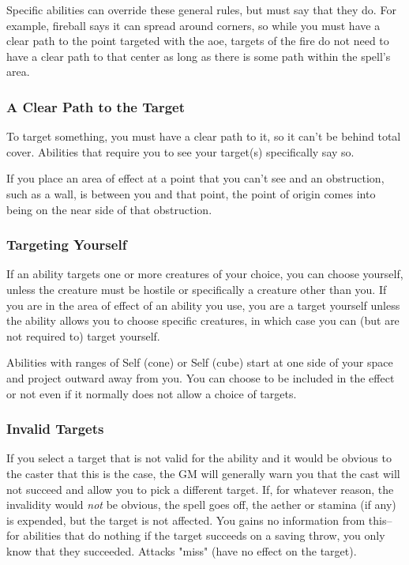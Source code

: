 Specific abilities can override these general rules, but must say that they do. For example, fireball says it can spread around corners, so while you must have a clear path to the point targeted with the aoe, targets of the fire do not need to have a clear path to that center as long as there is some path within the spell's area.

\subsubsection{A Clear Path to the Target}

To target something, you must have a clear path to it, so it can't be behind total cover. Abilities that require you to see your target(s) specifically say so.

If you place an area of effect at a point that you can't see and an obstruction, such as a wall, is between you and that point, the point of origin comes into being on the near side of that obstruction.

\subsubsection{Targeting Yourself}

If an ability targets one or more creatures of your choice, you can choose yourself, unless the creature must be hostile or specifically a creature other than you. If you are in the area of effect of an ability you use, you are a target yourself unless the ability allows you to choose specific creatures, in which case you can (but are not required to) target yourself.

Abilities with ranges of Self (cone) or Self (cube) start at one side of your space and project outward away from you. You can choose to be included in the effect or not even if it normally does not allow a choice of targets.

\subsubsection{Invalid Targets}\label{sec:invalid-targets}

If you select a target that is not valid for the ability and it would be obvious to the caster that this is the case, the GM will generally warn you that the cast will not succeed and allow you to pick a different target. If, for whatever reason, the invalidity would \textit{not} be obvious, the spell goes off, the aether or stamina (if any) is expended, but the target is not affected. You gains no information from this--for abilities that do nothing if the target succeeds on a saving throw, you only know that they succeeded. Attacks "miss" (have no effect on the target).

